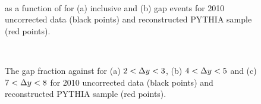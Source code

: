 \begin{figure}
\centering
\mbox{
              \quad
              \quad
                              }
\caption[Comparison of the data and PYTHIA for \costwodphi{}]{
\mean{\costwodphi{}} as a function of \dy{} for (a) inclusive and (b) gap events for 2010 uncorrected data (black points) and reconstructed PYTHIA sample (red points).
\label{GBJ2:Uncorr:cos2}}
\end{figure}

\begin{figure}
\centering
\mbox{
      \quad
      \quad
}
\mbox{
      \quad
}
\caption[Comparison of the data and PYTHIA for the gap fraction as a function of \qz{}]{
The gap fraction against \qz{} for (a) $2<\mbox{$\Delta y$}{}<3$, (b) $4<\mbox{$\Delta y$}{}<5$ and (c) $7<\mbox{$\Delta y$}{}<8$ for 2010 uncorrected data (black points) and reconstructed PYTHIA sample (red points).
\label{GBJ2:Uncorr:Q0}}
\end{figure}

